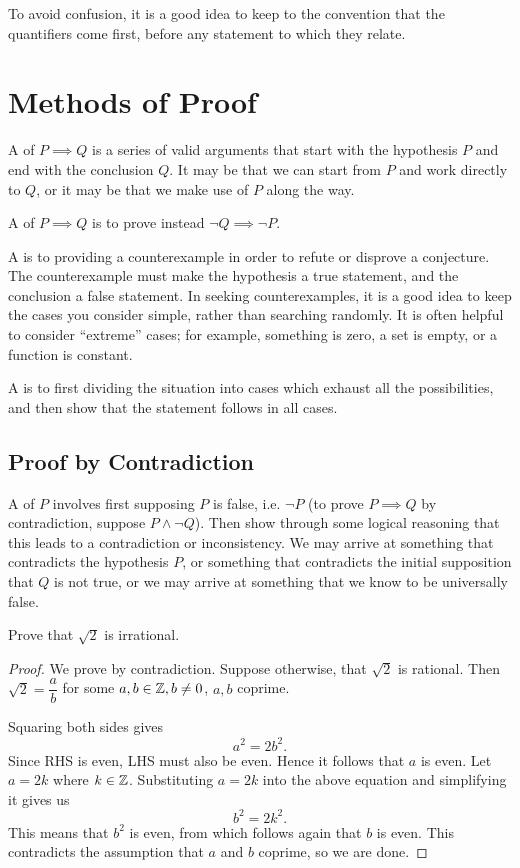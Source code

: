 \begin{remark}
To avoid confusion, it is a good idea to keep to the convention that the quantifiers come first, before any statement to which they relate.
\end{remark}
\pagebreak

\section{Methods of Proof}
A  of $P \implies Q$ is a series of valid arguments that start with the hypothesis $P$ and end with the conclusion $Q$. It may be that we can start from $P$ and work directly to $Q$, or it may be that we make use of $P$ along the way.

A  of $P \implies Q$ is to prove instead $\lnot Q \implies \lnot P$.

A  is to providing a counterexample in order to refute or disprove a conjecture. The counterexample must make the hypothesis a true statement, and the conclusion a false statement. In seeking counterexamples, it is a good idea to keep the cases you consider simple, rather than searching randomly. It is often helpful to consider ``extreme'' cases; for example, something is zero, a set is empty, or a function is constant.

A  is to first dividing the situation into cases which exhaust all the possibilities, and then show that the statement follows in all cases.

\subsection{Proof by Contradiction}
A  of $P$ involves first supposing $P$ is false, i.e. $\lnot P$ (to prove $P \implies Q$ by contradiction, suppose $P\land\lnot Q$). Then show through some logical reasoning that this leads to a contradiction or inconsistency. We may arrive at something that contradicts the hypothesis $P$, or something that contradicts the initial supposition that $Q$ is not true, or we may arrive at something that we know to be universally false.

\begin{example}
Prove that $\sqrt{2}$ is irrational.
\begin{proof}
We prove by contradiction. Suppose otherwise, that $\sqrt{2}$ is rational. Then $\sqrt{2}=\dfrac{a}{b}$ for some $a,b\in\mathbb Z,b\neq 0$, $a,b$ coprime.

Squaring both sides gives
\[a^2=2b^2.\]
Since RHS is even, LHS must also be even. Hence it follows that $a$ is even. Let $a=2k$ where $k\in\mathbb Z$. Substituting $a = 2k$ into the above equation and simplifying it gives us
\[b^2=2k^2.\]
This means that $b^2$ is even, from which follows again that $b$ is even. This contradicts the assumption that $a$ and $b$ coprime, so we are done.
\end{proof}
\end{example}


